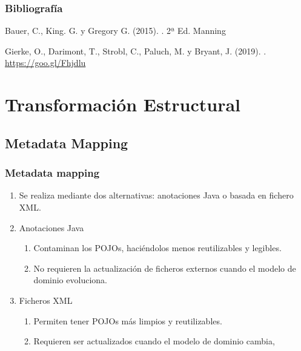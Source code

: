 \documentclass[a4paper,slidestop,xcolor=pst,blue]{beamer}
\begin{document}
\begin{frame}[c]
    \frametitle{Bibliografía}
    \begin{thebibliography}{1}

        Bauer, C., King. G. y Gregory G. (2015).
        . 2ª Ed.
        \newblock Manning

        Gierke, O., Darimont, T., Strobl, C., Paluch, M. y Bryant, J. (2019).
        .
        \url{https://goo.gl/Fhjdlu}
    \end{thebibliography}
\end{frame}

\section{Transformación Estructural}

\subsection{Metadata Mapping}

\begin{frame}[c]
    \frametitle{Metadata mapping}
    \begin{enumerate}[<+->]
         \item<1-> Se realiza mediante dos alternativas: anotaciones Java o basada en fichero XML.
         \item<2-> Anotaciones Java
             \begin{enumerate}
                \item<3-> Contaminan los POJOs, haciéndolos menos reutilizables y legibles.
                \item<4-> No requieren la actualización de ficheros externos cuando el modelo de dominio evoluciona.
             \end{enumerate}
         \item<5-> Ficheros XML
             \begin{enumerate}
                \item<6-> Permiten tener POJOs más limpios y reutilizables.
                \item<7-> Requieren ser actualizados cuando el modelo de dominio cambia,
             \end{enumerate}
    \end{enumerate}
\end{frame}
\end{document}
